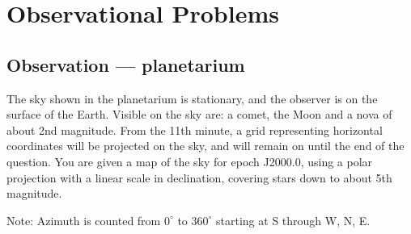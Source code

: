 \chapter{Observational Problems}

\section*{Observation --- planetarium}

The sky shown in the planetarium is stationary, and the observer is on the
surface of the Earth. Visible on the sky are: a comet, the Moon and a nova of
about 2nd magnitude. From the 11th minute, a grid representing horizontal
coordinates will be projected on the sky, and will remain on until the end of
the question. You are given a map of the sky for epoch J2000.0, using a polar
projection with a linear scale in declination, covering stars down to about
5th magnitude.

Note: Azimuth is counted from $0^\circ$ to $360^\circ$ starting at S through
W, N, E.

